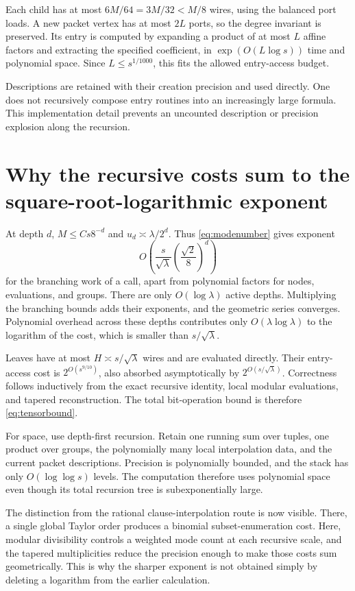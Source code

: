 \documentclass[11pt,a4paper]{article}
\numberwithin{equation}{section}
\theoremstyle{definition}
\theoremstyle{remark}
\begin{document}
Each child has at most $6M/64=3M/32<M/8$ wires, using the balanced port loads.
A new packet vertex has at most $2L$ ports, so the degree invariant is
preserved. Its entry is computed by expanding a product of at most $L$
affine factors and extracting the specified coefficient, in
$\exp(O(L\log s))$ time and polynomial space. Since $L\le s^{1/1000}$,
this fits the allowed entry-access budget.

Descriptions are retained with their creation precision and used directly.
One does not recursively compose entry routines into an increasingly large
formula. This implementation detail prevents an uncounted description or
precision explosion along the recursion.

\section{Why the recursive costs sum to the square-root-logarithmic exponent}
\label{sec:tensorcost}
At depth $d$, $M\le Cs8^{-d}$ and
$u_d\asymp\lambda/2^d$. Thus \eqref{eq:modenumber} gives exponent
\[
 O\left(\frac{s}{\sqrt\lambda}
                 \left(\frac{\sqrt2}{8}\right)^d\right)
\]
for the branching work of a call, apart from polynomial factors for nodes,
evaluations, and groups. There are only $O(\log\lambda)$ active depths.
Multiplying the branching bounds adds their exponents, and the geometric
series converges. Polynomial overhead across these depths contributes only
$O(\lambda\log\lambda)$ to the logarithm of the cost, which is smaller than
$s/\sqrt\lambda$.

Leaves have at most $H\asymp s/\sqrt\lambda$ wires and are evaluated directly.
Their entry-access cost is $2^{O(s^{9/10})}$, also absorbed asymptotically by
$2^{O(s/\sqrt\lambda)}$. Correctness follows inductively from the exact
recursive identity, local modular evaluations, and tapered reconstruction.
The total bit-operation bound is therefore \eqref{eq:tensorbound}.

For space, use depth-first recursion. Retain one running sum over tuples,
one product over groups, the polynomially many local interpolation data,
and the current packet descriptions. Precision is polynomially bounded, and
the stack has only $O(\log\log s)$ levels. The computation therefore uses
polynomial space even though its total recursion tree is subexponentially
large.

The distinction from the rational clause-interpolation route is now visible.
There, a single global Taylor order produces a binomial subset-enumeration
cost. Here, modular divisibility controls a weighted mode count at each
recursive scale, and the tapered multiplicities reduce the precision enough
to make those costs sum geometrically. This is why the sharper exponent is
not obtained simply by deleting a logarithm from the earlier calculation.
\end{document}
